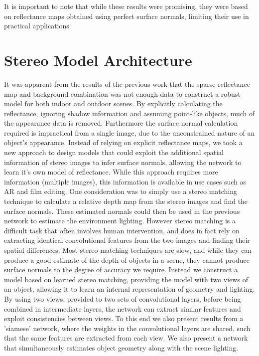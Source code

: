 \documentclass[ %
                    author={Gavin Parker},
                supervisor={Dr. Neill Campbell},
                    degree={MEng},
                     title={Deep Siamese Networks for Illumination Estimation from Stereo Images},
                  subtitle={},
                      type={research},
                      year={2018} ]{dissertation}
\begin{document}
\newline
It is important to note that while these results were promising, they were based on reflectance maps obtained using perfect surface normals, limiting their use in practical applications. 
\section{Stereo Model Architecture}
It was apparent from the results of the previous work that the sparse reflectance map and background combination was not enough data to construct a robust model for both indoor and outdoor scenes. By explicitly calculating the reflectance, ignoring shadow information and assuming point-like objects, much of the appearance data is removed. Furthermore the surface normal calculation required is impractical from a single image, due to the unconstrained nature of an object's appearance. Instead of relying on explicit reflectance maps, we took a new approach to design models that could exploit the additional spatial information of stereo images to infer surface normals, allowing the network to learn it's own model of reflectance. While this approach requires more information (multiple images), this information is available in use cases such as AR and film editing. One consideration was to simply use a stereo matching technique to calculate a relative depth map from the stereo images and find the surface normals. These estimated normals could then be used in the previous network to estimate the environment lighting. However stereo matching is a difficult task that often involves human intervention, and does in fact rely on extracting identical convolutional features from the two images and finding their spatial differences. Most stereo matching techniques are slow, and while they can produce a good estimate of the depth of objects in a scene, they cannot produce surface normals to the degree of accuracy we require. Instead we construct a model based on learned stereo matching, providing the model with two views of an object, allowing it to learn an internal representation of geometry and lighting. By using two views, provided to two sets of convolutional layers, before being combined in intermediate layers, the network can extract similar features and exploit consistencies between views. To this end we also present results from a 'siamese' network, where the weights in the convolutional layers are shared, such that the same features are extracted from each view. We also present a network that simultaneously estimates object geometry along with the scene lighting.
\end{document}
